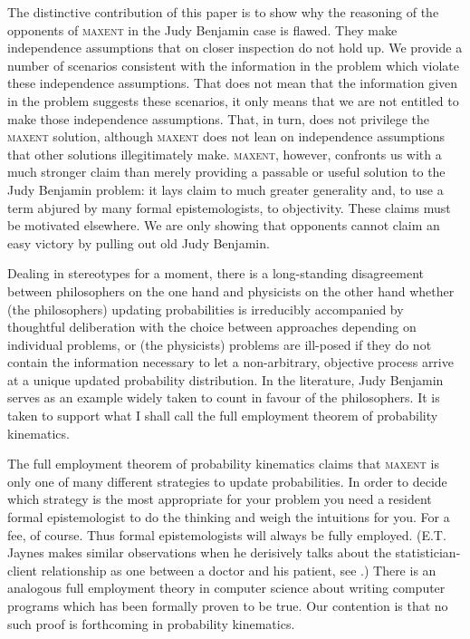 \documentclass[11pt]{article}
\begin{document}
The distinctive contribution of this paper is to show why the
reasoning of the opponents of \textsc{maxent} in the Judy Benjamin
case is flawed. They make independence assumptions that on closer
inspection do not hold up. We provide a number of scenarios consistent
with the information in the problem which violate these independence
assumptions. That does not mean that the information given in the
problem suggests these scenarios, it only means that we are not
entitled to make those independence assumptions. That, in turn, does
not privilege the \textsc{maxent} solution, although \textsc{maxent}
does not lean on independence assumptions that other solutions
illegitimately make. \textsc{maxent}, however, confronts us with a
much stronger claim than merely providing a passable or useful
solution to the Judy Benjamin problem: it lays claim to much greater
generality and, to use a term abjured by many formal epistemologists,
to objectivity. These claims must be motivated elsewhere. We are only
showing that opponents cannot claim an easy victory by pulling out old
Judy Benjamin.

Dealing in stereotypes for a moment, there is a long-standing
disagreement between philosophers on the one hand and physicists on
the other hand whether (the philosophers) updating probabilities is
irreducibly accompanied by thoughtful deliberation with the choice
between approaches depending on individual problems, or (the
physicists) problems are ill-posed if they do not contain the
information necessary to let a non-arbitrary, objective process arrive
at a unique updated probability distribution. In the literature, Judy
Benjamin serves as an example widely taken to count in favour of the
philosophers. It is taken to support what I shall call the full
employment theorem of probability kinematics.

The full employment theorem of probability kinematics claims that
\textsc{maxent} is only one of many different strategies to update
probabilities. In order to decide which strategy is the most
appropriate for your problem you need a resident formal epistemologist
to do the thinking and weigh the intuitions for you. For a fee, of
course. Thus formal epistemologists will always be fully employed.
(E.T. Jaynes makes similar observations when he derisively talks about
the statistician-client relationship as one between a doctor and his
patient, see .) There is an analogous
full employment theory in computer science about writing computer
programs which has been formally proven to be true. Our contention is
that no such proof is forthcoming in probability kinematics. 
\end{document}
